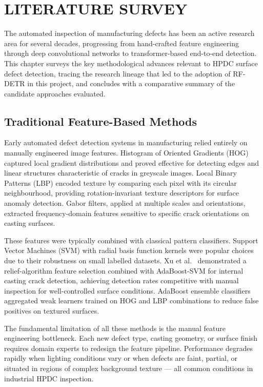 \chapter{LITERATURE SURVEY}

\justify

The automated inspection of manufacturing defects has been an active research area for several decades, progressing from hand-crafted feature engineering through deep convolutional networks to transformer-based end-to-end detection. This chapter surveys the key methodological advances relevant to HPDC surface defect detection, tracing the research lineage that led to the adoption of RF-DETR in this project, and concludes with a comparative summary of the candidate approaches evaluated.

\section{Traditional Feature-Based Methods}

Early automated defect detection systems in manufacturing relied entirely on manually engineered image features. Histogram of Oriented Gradients (HOG) \cite{simonyan2014} captured local gradient distributions and proved effective for detecting edges and linear structures characteristic of cracks in greyscale images. Local Binary Patterns (LBP) encoded texture by comparing each pixel with its circular neighbourhood, providing rotation-invariant texture descriptors for surface anomaly detection. Gabor filters, applied at multiple scales and orientations, extracted frequency-domain features sensitive to specific crack orientations on casting surfaces.

These features were typically combined with classical pattern classifiers. Support Vector Machines (SVM) with radial basis function kernels were popular choices due to their robustness on small labelled datasets. Xu et al.\ \cite{xu2020} demonstrated a relief-algorithm feature selection combined with AdaBoost-SVM for internal casting crack detection, achieving detection rates competitive with manual inspection for well-controlled surface conditions. AdaBoost ensemble classifiers aggregated weak learners trained on HOG and LBP combinations to reduce false positives on textured surfaces.

The fundamental limitation of all these methods is the manual feature engineering bottleneck. Each new defect type, casting geometry, or surface finish requires domain experts to redesign the feature pipeline. Performance degrades rapidly when lighting conditions vary or when defects are faint, partial, or situated in regions of complex background texture --- all common conditions in industrial HPDC inspection.

